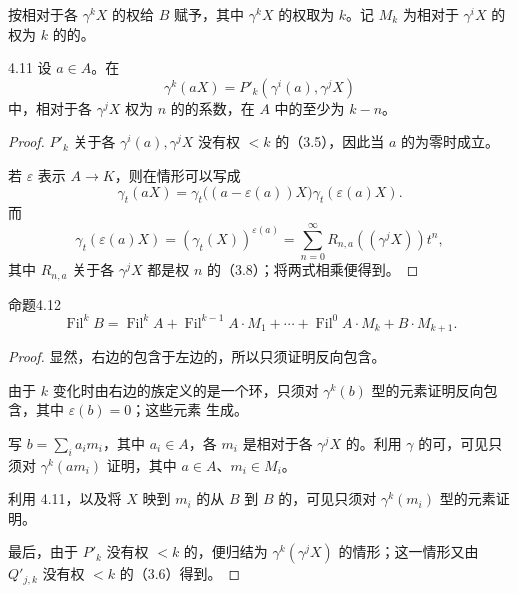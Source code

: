 按相对于各 $\gamma^kX$ 的权给 $B$ 赋予，其中 $\gamma^kX$ 的权取为 $k$。记 $M_k$ 为相对于 $\gamma^iX$ 的权为 $k$ 的的。

\begin{SGAresult}{}{4.11}
设 $a\in A$。在
\[
\gamma^k(aX)=P'_k(\gamma^i(a),\gamma^jX)
\]
中，相对于各 $\gamma^jX$ 权为 $n$ 的的系数，在 $A$ 中的至少为 $k-n$。
\end{SGAresult}
\begin{proof}
 $P'_k$ 关于各 $\gamma^i(a),\gamma^jX$ 没有权 $<k$ 的（3.5），因此当 $a$ 的为零时成立。

若 $\varepsilon$ 表示 $A\longrightarrow K$，则在情形可以写成
\[
\gamma_t(aX)=\gamma_t\bigl((a-\varepsilon(a))X\bigr)\gamma_t(\varepsilon(a)X).
\]
而
\[
\gamma_t(\varepsilon(a)X)=(\gamma_t(X))^{\varepsilon(a)}
=\sum_{n=0}^{\infty}R_{n,a}((\gamma^jX))t^n,
\]
其中 $R_{n,a}$ 关于各 $\gamma^jX$ 都是权 $n$ 的（3.8）；将两式相乘便得到。
\end{proof}

\begin{SGAresult}{命题}{4.12}
\[
\operatorname{Fil}^kB=\operatorname{Fil}^kA
+\operatorname{Fil}^{k-1}A\cdot M_1+\cdots
+\operatorname{Fil}^0A\cdot M_k+B\cdot M_{k+1}.
\]
\end{SGAresult}
\begin{proof}
显然，右边的包含于左边的，所以只须证明反向包含。

由于 $k$ 变化时由右边的族定义的是一个环，只须对 $\gamma^k(b)$ 型的元素证明反向包含，其中 $\varepsilon(b)=0$；这些元素
生成。

写 $b=\sum_i a_im_i$，其中 $a_i\in A$，各 $m_i$ 是相对于各 $\gamma^jX$ 的。利用 $\gamma$ 的可，可见只须对 $\gamma^k(am_i)$ 证明，其中 $a\in A$、$m_i\in M_i$。

利用 4.11，以及将 $X$ 映到 $m_i$ 的从 $B$ 到 $B$ 的，可见只须对 $\gamma^k(m_i)$ 型的元素证明。

最后，由于 $P'_k$ 没有权 $<k$ 的，便归结为 $\gamma^k(\gamma^jX)$ 的情形；这一情形又由 $Q'_{j,k}$ 没有权 $<k$ 的（3.6）得到。
\end{proof}

